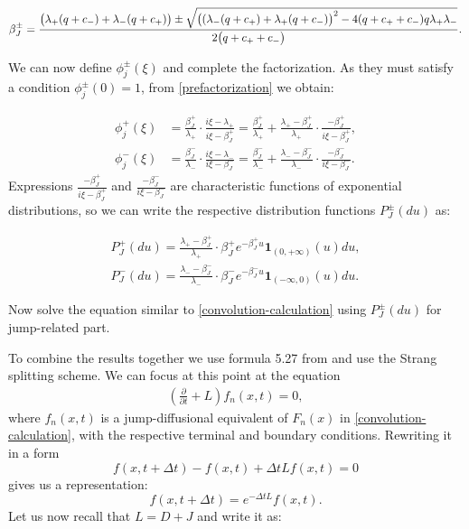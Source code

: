 \documentclass[a4paper]{jpconf}
\begin{document}
{\begin{equation}
\beta^\pm_J = \frac{\bigr{(}\lambda_+(q+c_-) + \lambda_-(q + c_+)\bigr{)} \pm \sqrt{\bigr{(}(\lambda_- (q+c_+) + \lambda_+ (q + c_-)\bigr{)}^2 - 4 (q + c_+ + c_-) q \lambda_+ \lambda_-} }{2\bigr{(}q + c_+ + c_-\bigr{)}}.
\end{equation}

We can now define $\phi_j^\pm(\xi)$ and complete the factorization. As they must satisfy a condition $\phi_j^\pm(0) = 1$, from \eqref{prefactorization} we obtain:

\begin{align}\label{factors-cou-preliminary}
\phi_j^+(\xi) &= \frac{\beta^+_J}{\lambda_+} \cdot \frac{i\xi - \lambda_+}{i\xi - \beta^+_J} = \frac{\beta^+_J}{\lambda_+} + \frac{\lambda_+-\beta^+_J}{\lambda_+} \cdot \frac{-\beta^+_J}{i \xi - \beta^+_J}, \\ 
\phi_j^-(\xi) &= \frac{\beta^-_J}{\lambda_-} \cdot \frac{i\xi - \lambda_-}{i\xi - \beta^-_J} = \frac{\beta^-_J}{\lambda_-} + \frac{\lambda_- - \beta^-_J}{\lambda_-} \cdot \frac{-\beta^-_J}{i \xi - \beta^-_J}.
\end{align}
Expressions $\frac{-\beta^+_J}{i \xi - \beta^+_J}$ and $\frac{-\beta^-_J}{i \xi - \beta^-_J}$ are characteristic functions of exponential distributions, so we can write the respective distribution functions $P^\pm_J(du)$ as:

\begin{align}
P^+_J(du) = \frac{\lambda_+ - \beta^+_J}{\lambda_+} \cdot \beta^+_J e^{-\beta^+_J u} \mathbf{1}_{(0, +\infty)}(u) du, \\
P^-_J(du) = \frac{\lambda_- - \beta^-_J}{\lambda_-} \cdot \beta^-_J e^{-\beta^-_J u} \mathbf{1}_{(-\infty, 0)}(u) du.
\end{align}

Now solve the equation similar to \eqref{convolution-calculation} using $P^\pm_J(du)$ for jump-related part.

To combine the results together we use formula 5.27 from \cite{itkin} and use the Strang splitting scheme. We can focus at this point at the equation
\begin{align}\label{jump-diffusion-problem}
(\frac{\partial}{\partial t} + L)f_n(x, t) = 0,
\end{align}
where $f_n(x, t)$ is a jump-diffusional equivalent of $F_n(x)$ in \eqref{convolution-calculation}, with the respective terminal and boundary conditions. Rewriting it in a form
\begin{equation}
f(x, t+\Delta t) - f(x, t) + \Delta t L f(x,t) = 0
\end{equation}
gives us a representation:
\begin{equation}\label{solution-exp}
f(x, t+\Delta t) = e^{-\Delta t L} f(x, t).
\end{equation}
Let us now recall that $L = D + J$ and write it as:

}
\end{document}
